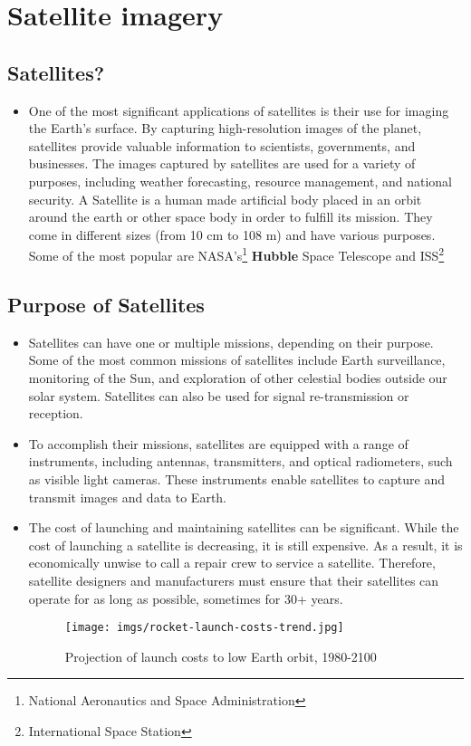\documentclass{article}
\begin{document}
    
    
\section{Satellite imagery}
    \subsection{Satellites?}
        \begin{itemize}
            \item[] One of the most significant applications of satellites is their use for imaging the Earth's surface. By capturing high-resolution images of the planet, satellites provide valuable information to scientists, governments, and businesses. The images captured by satellites are used for a variety of purposes, including weather forecasting, resource management, and national security. A Satellite is a human made artificial body placed in an orbit around the earth or other space body in order to fulfill its mission. They come in different sizes (from 10 cm to 108 m) and have various purposes. Some of the most popular are NASA's\footnote{National Aeronautics and Space Administration} \textbf{Hubble} Space Telescope and ISS\footnote{International Space Station}
            
        \end{itemize}
    \subsection{Purpose of Satellites}
        \begin{itemize}
            \item[] Satellites can have one or multiple missions, depending on their purpose. Some of the most common missions of satellites include Earth surveillance, monitoring of the Sun, and exploration of other celestial bodies outside our solar system. Satellites can also be used for signal re-transmission or reception.
            \item[] To accomplish their missions, satellites are equipped with a range of instruments, including antennas, transmitters, and optical radiometers, such as visible light cameras. These instruments enable satellites to capture and transmit images and data to Earth.
            \item[] The cost of launching and maintaining satellites can be significant. While the cost of launching a satellite is decreasing, it is still expensive. As a result, it is economically unwise to call a repair crew to service a satellite. Therefore, satellite designers and manufacturers must ensure that their satellites can operate for as long as possible, sometimes for 30+ years.
            \begin{figure}[H]
                \centering
                \texttt{[image: imgs/rocket-launch-costs-trend.jpg]}  
                \caption{Projection of launch costs to low Earth orbit, 1980-2100 \cite{1}}
            \end{figure}
        \end{itemize}
\end{document}
